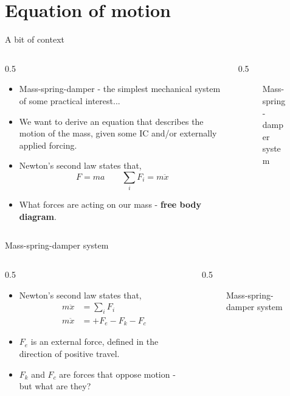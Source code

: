 \documentclass[11pt,aspectratio=169,handout]{beamer}
\begin{document}
\section{Equation of motion}
\begin{frame}[c]{A bit of context}
	\begin{columns}[T]
		\begin{column}{0.5\textwidth}
			\begin{itemize}
				\item<1-> Mass-spring-damper - the simplest mechanical system of some practical interest...
				\item<2-> We want to derive an equation that describes the motion of the mass, given some IC and/or externally applied forcing.
				\item<3-> Newton's second law states that,
					\begin{equation}
						F=ma \quad\quad 	\sum_i F_i = m\ddot{x}
					\end{equation}
				\item<4-> What forces are acting on our mass - \textbf{free body diagram}. 
			\end{itemize}
		\end{column}
		\begin{column}{0.5\textwidth}
			\begin{figure}
			
			\caption{Mass-spring-damper system}
			\end{figure}
		\end{column}
	\end{columns}
\end{frame}


\begin{frame}[c]{Mass-spring-damper system}
	\begin{columns}[T]
		\begin{column}{0.5\textwidth}
			\begin{itemize}
				\item Newton's second law states that,
				\begin{align}\nonumber
					m\ddot{x} &= \sum_i F_i \\
					m \ddot{x} &= +F_e - F_k - F_c 
				\end{align}
				\item $F_e$ is an external force, defined in the direction of positive travel.
				\item $F_k$ and $F_c$ are forces that oppose motion - but what are they? 
			\end{itemize}
		\end{column}
		\begin{column}{0.5\textwidth}
			\begin{figure}
			\centering
			
			\caption{Mass-spring-damper system}
		\end{figure}
		\end{column}
	\end{columns}
\end{frame}
\end{document}
